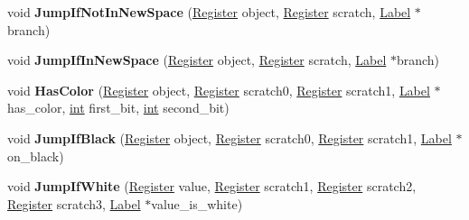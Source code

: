 \begin{DoxyCompactItemize}
\mbox{\label{classv8_1_1internal_1_1MacroAssembler_a4ff0d45ec143ef6dd823d7ec9420da80}} 
void {\bfseries Jump\+If\+Not\+In\+New\+Space} (\mbox{\hyperlink{classv8_1_1internal_1_1Register}{Register}} object, \mbox{\hyperlink{classv8_1_1internal_1_1Register}{Register}} scratch, \mbox{\hyperlink{classv8_1_1internal_1_1Label}{Label}} $\ast$branch)
\item 
\mbox{\label{classv8_1_1internal_1_1MacroAssembler_a3e7c4d1e419d5305e4589d0b47c4fadd}} 
void {\bfseries Jump\+If\+In\+New\+Space} (\mbox{\hyperlink{classv8_1_1internal_1_1Register}{Register}} object, \mbox{\hyperlink{classv8_1_1internal_1_1Register}{Register}} scratch, \mbox{\hyperlink{classv8_1_1internal_1_1Label}{Label}} $\ast$branch)
\item 
\mbox{\label{classv8_1_1internal_1_1MacroAssembler_af2ca9bcdecb35e016e8f7806bf7e0161}} 
void {\bfseries Has\+Color} (\mbox{\hyperlink{classv8_1_1internal_1_1Register}{Register}} object, \mbox{\hyperlink{classv8_1_1internal_1_1Register}{Register}} scratch0, \mbox{\hyperlink{classv8_1_1internal_1_1Register}{Register}} scratch1, \mbox{\hyperlink{classv8_1_1internal_1_1Label}{Label}} $\ast$has\+\_\+color, \mbox{\hyperlink{classint}{int}} first\+\_\+bit, \mbox{\hyperlink{classint}{int}} second\+\_\+bit)
\item 
\mbox{\label{classv8_1_1internal_1_1MacroAssembler_afa6130b855c3a0cba5e359c3b0abc45d}} 
void {\bfseries Jump\+If\+Black} (\mbox{\hyperlink{classv8_1_1internal_1_1Register}{Register}} object, \mbox{\hyperlink{classv8_1_1internal_1_1Register}{Register}} scratch0, \mbox{\hyperlink{classv8_1_1internal_1_1Register}{Register}} scratch1, \mbox{\hyperlink{classv8_1_1internal_1_1Label}{Label}} $\ast$on\+\_\+black)
\item 
\mbox{\label{classv8_1_1internal_1_1MacroAssembler_a391a92e786e96f89deebed6b210512fc}} 
void {\bfseries Jump\+If\+White} (\mbox{\hyperlink{classv8_1_1internal_1_1Register}{Register}} value, \mbox{\hyperlink{classv8_1_1internal_1_1Register}{Register}} scratch1, \mbox{\hyperlink{classv8_1_1internal_1_1Register}{Register}} scratch2, \mbox{\hyperlink{classv8_1_1internal_1_1Register}{Register}} scratch3, \mbox{\hyperlink{classv8_1_1internal_1_1Label}{Label}} $\ast$value\+\_\+is\+\_\+white)

\end{DoxyCompactItemize}
